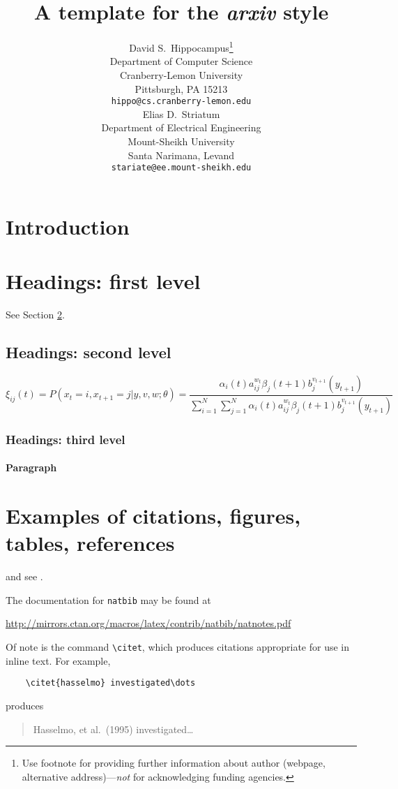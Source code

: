 \documentclass{article}
\title{A template for the \emph{arxiv} style}
\author{
	David S.~Hippocampus\thanks{Use footnote for providing further
		information about author (webpage, alternative
		address)---\emph{not} for acknowledging funding agencies.} \\
	Department of Computer Science\\
	Cranberry-Lemon University\\
	Pittsburgh, PA 15213 \\
	\texttt{hippo@cs.cranberry-lemon.edu} \\
	\And
	Elias D.~Striatum \\
	Department of Electrical Engineering\\
	Mount-Sheikh University\\
	Santa Narimana, Levand \\
	\texttt{stariate@ee.mount-sheikh.edu} \\
}
\begin{document}
	\maketitle
	
	\begin{abstract}
		\lipsum[1]
	\end{abstract}
	
	
	
	
	\section{Introduction}
	\lipsum[2]
	\lipsum[3]
	
	
	\section{Headings: first level}
	\label{sec:headings}
	
	\lipsum[4] See Section \ref{sec:headings}.
	
	\subsection{Headings: second level}
	\lipsum[5]
	\begin{equation}
	\xi _{ij}(t)=P(x_{t}=i,x_{t+1}=j|y,v,w;\theta)= {\frac {\alpha _{i}(t)a^{w_t}_{ij}\beta _{j}(t+1)b^{v_{t+1}}_{j}(y_{t+1})}{\sum _{i=1}^{N} \sum _{j=1}^{N} \alpha _{i}(t)a^{w_t}_{ij}\beta _{j}(t+1)b^{v_{t+1}}_{j}(y_{t+1})}}
	\end{equation}
	
	\subsubsection{Headings: third level}
	\lipsum[6]
	
	\paragraph{Paragraph}
	\lipsum[7]
	
	\section{Examples of citations, figures, tables, references}
	\label{sec:others}
	\lipsum[8] \cite{kour2014real,kour2014fast} and see \cite{hadash2018estimate}.
	
	The documentation for \verb+natbib+ may be found at
	\begin{center}
		\url{http://mirrors.ctan.org/macros/latex/contrib/natbib/natnotes.pdf}
	\end{center}
	Of note is the command \verb+\citet+, which produces citations
	appropriate for use in inline text.  For example,
	\begin{verbatim}
	\citet{hasselmo} investigated\dots
	\end{verbatim}
	produces
	\begin{quote}
		Hasselmo, et al.\ (1995) investigated\dots
	\end{quote}
	
\end{document}
